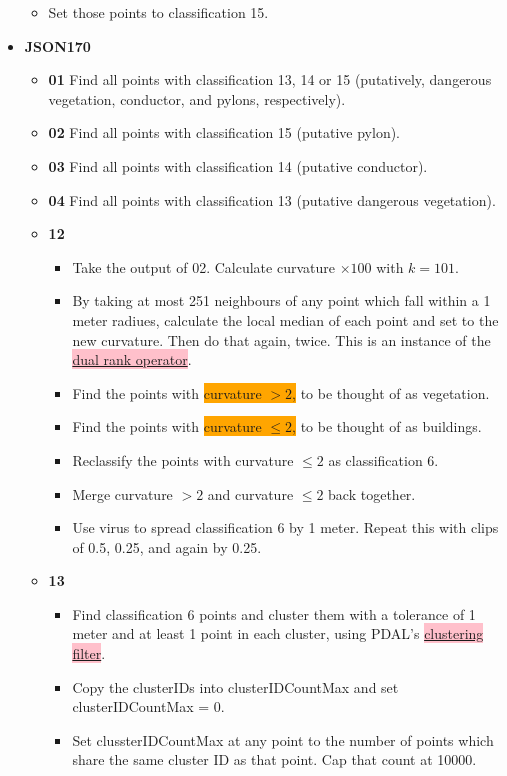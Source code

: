 \documentclass[a4paper,11pt,twoside]{article}
\theoremstyle{definition}
\theoremstyle{remark}
\newcommand{\sh}[1]{\colorbox{pink}{#1}}
\newcommand{\bad}[1]{\colorbox{orange}{#1}}
\begin{document}
\begin{itemize}
\begin{itemize}
\item Set those points to classification 15.
\end{itemize}
\item \textbf{JSON170}
\begin{itemize}
\item \textbf{01} Find all points with classification 13, 14 or 15 (putatively, dangerous vegetation, conductor, and pylons, respectively).
\item \textbf{02} Find all points with classification 15 (putative pylon).
\item \textbf{03} Find all points with classification 14 (putative conductor).
\item \textbf{04} Find all points with classification 13 (putative dangerous vegetation).
\item \textbf{12} 
\begin{itemize}
\item Take the output of 02. Calculate curvature $\times 100$ with $k=101$.
\item By taking at most 251 neighbours of any point which fall within a 1 meter radiues, calculate the local median of each point and set to the new curvature. Then do that again, twice. This is an instance of the \hyperref[dual]{\sh{dual rank operator}}.
\item Find the points with \bad{curvature $>2$,} to be thought of as vegetation. 
\item Find the points with \bad{curvature $\leqslant 2$,} to be thought of as buildings.
\item Reclassify the points with curvature $\leqslant 2$ as classification 6.
\item Merge curvature $>2$ and curvature $\leqslant 2$ back together.
\item Use virus to spread classification 6 by 1 meter. Repeat this with clips of 0.5, 0.25, and again by 0.25.
\end{itemize}
\item \textbf{13} 
\begin{itemize}
\item Find classification 6 points and cluster them with a tolerance of 1 meter and at least 1 point in each cluster, using PDAL's \hyperref[clus]{\sh{clustering filter}}.
\item Copy the clusterIDs into clusterIDCountMax and set clusterIDCountMax = 0.
\item Set clussterIDCountMax at any point to the number of points which share the same cluster ID as that point. Cap that count at 10000.

\end{itemize}
\end{itemize}
\end{itemize}
\end{document}

